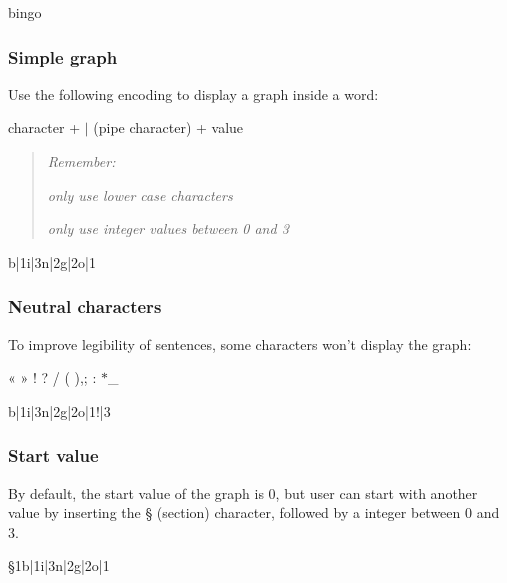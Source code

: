 \begin{DoxyPre}{\ttfamily bingo}\end{DoxyPre}




\subsubsection*{Simple graph}

Use the following encoding to display a graph inside a word\+:

{\ttfamily character} + {\ttfamily $\vert$} (pipe character) + {\ttfamily value}

\begin{quote}
{\itshape Remember\+:}


\begin{DoxyItemize}
\item {\itshape only use lower case characters}
\item {\itshape only use integer values between 0 and 3} 
\end{DoxyItemize}\end{quote}



\begin{DoxyPre}{\ttfamily b|1i|3n|2g|2o|1}\end{DoxyPre}




\subsubsection*{Neutral characters}

To improve legibility of sentences, some characters won’t display the graph\+:

{\ttfamily « » ! ? / ( ),; \+: $\ast$\+\_\+}


\begin{DoxyPre}{\ttfamily b|1i|3n|2g|2o|1!|3}\end{DoxyPre}




\subsubsection*{Start value}

By default, the start value of the graph is 0, but user can start with another value by inserting the {\ttfamily §} (section) character, followed by a integer between 0 and 3.


\begin{DoxyPre}{\ttfamily §1b|1i|3n|2g|2o|1}\end{DoxyPre}





